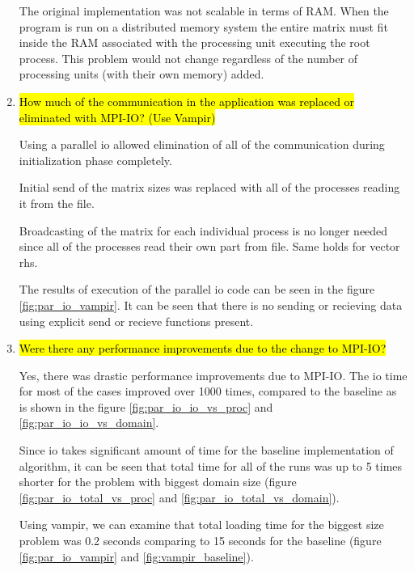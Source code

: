 \begin{enumerate}
  The original implementation was not scalable in terms of RAM. 
  When the program is run on a distributed memory system the entire matrix must fit inside the RAM associated with 
  the processing unit executing the root process. This problem would not change regardless of the number of 
  processing units (with their own memory) added.
  
  \item \hl{How much of the communication in the application was replaced or eliminated with MPI-IO? (Use
Vampir)}

  Using a parallel io allowed elimination of all of the communication during initialization phase completely.

  Initial send of the matrix sizes was replaced with all of the processes reading it from the file.

  Broadcasting of the matrix for each individual process is no longer needed since all of the processes read their own 
  part from file. Same holds for vector rhs.

  The results of execution of the parallel io code can be seen in the figure \ref{fig:par_io_vampir}. It can be seen
  that there is no sending or recieving data using explicit send or recieve functions present.

  \item \hl{Were there any performance improvements due to the change to MPI-IO?}
  
  Yes, there was drastic performance improvements due to MPI-IO. The io time for most of the cases improved over 1000
  times, compared to the baseline as is shown in the figure \ref{fig:par_io_io_vs_proc} and 
  \ref{fig:par_io_io_vs_domain}.

  Since io takes significant amount of time for the baseline implementation of algorithm, it can be seen that 
  total time for all of the runs was up to 5 times shorter for the problem with biggest domain size (figure 
  \ref{fig:par_io_total_vs_proc} and \ref{fig:par_io_total_vs_domain}).

  Using vampir, we can examine that total loading time for the biggest size problem was 0.2 seconds comparing to 15 seconds
  for the baseline (figure \ref{fig:par_io_vampir} and \ref{fig:vampir_baseline}).


\end{enumerate}

